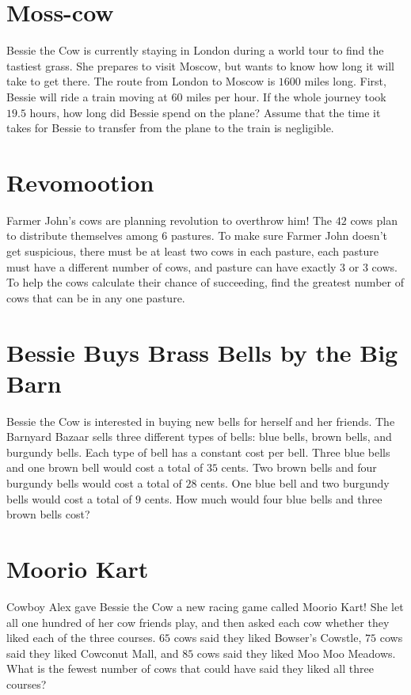 \documentclass{article}
\begin{document}
\section*{Moss-cow}
Bessie the Cow is currently staying in London during a world tour to find the tastiest grass.
She prepares to visit Moscow, but wants to know how long it will take to get there.
The route from London to Moscow is $1600$ miles long.
First, Bessie will ride a train moving at $60$ miles per hour.
If the whole journey took $19.5$ hours, how long did Bessie spend on the plane?
Assume that the time it takes for Bessie to transfer from the plane to the train is negligible.

\section*{Revomootion}
Farmer John's cows are planning revolution to overthrow him!
The $42$ cows plan to distribute themselves among $6$ pastures.
To make sure Farmer John doesn't get suspicious, there must be at least two cows in each pasture, each pasture must have a different number of cows, and pasture can have exactly $3$ or $3$ cows.
To help the cows calculate their chance of succeeding, find the greatest number of cows that can be in any one pasture.

\section*{Bessie Buys Brass Bells by the Big Barn}
Bessie the Cow is interested in buying new bells for herself and her friends.
The Barnyard Bazaar sells three different types of bells: blue bells, brown bells, and burgundy bells.
Each type of bell has a constant cost per bell.
Three blue bells and one brown bell would cost a total of $35$ cents.
Two brown bells and four burgundy bells would cost a total of $28$ cents.
One blue bell and two burgundy bells would cost a total of $9$ cents.
How much would four blue bells and three brown bells cost?

\section*{Moorio Kart}
Cowboy Alex gave Bessie the Cow a new racing game called Moorio Kart!
She let all one hundred of her cow friends play, and then asked each cow whether they liked each of the three courses.
$65$ cows said they liked Bowser's Cowstle, $75$ cows said they liked Cowconut Mall, and $85$ cows said they liked Moo Moo Meadows.
What is the fewest number of cows that could have said they liked all three courses?
\end{document}
